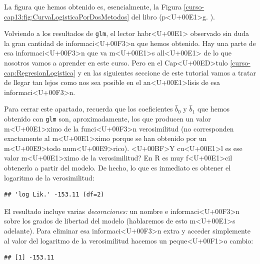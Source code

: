\documentclass[10pt,a4paper]{article}
\begin{document}
La figura que hemos obtenido es, esencialmente, la Figura \ref{curso-cap13:fig:CurvaLogisticaPorDosMetodos} del libro (p<U+00E1>g. \pageref{curso-cap13:fig:CurvaLogisticaPorDosMetodos}).

Volviendo a los resultados de {\tt glm}, el lector habr<U+00E1> observado sin duda la gran cantidad de informaci<U+00F3>n que hemos obtenido. Hay una parte de esa informaci<U+00F3>n que va m<U+00E1>s all<U+00E1> de lo que nosotros vamos a aprender en este curso. Pero en el Cap<U+00ED>tulo \ref{curso-cap:RegresionLogistica} y en las siguientes seccione de este tutorial vamos a tratar de llegar tan lejos como nos sea posible en el an<U+00E1>lisis de esa informaci<U+00F3>n.

Para cerrar este apartado, recuerda que los coeficientes $\hat b_0$ y $\hat b_1$ que hemos obtenido con {\tt glm} son, aproximadamente, los que producen un valor m<U+00E1>ximo de la funci<U+00F3>n verosimilitud (no corresponden exactamente al m<U+00E1>ximo porque se han obtenido por un m<U+00E9>todo num<U+00E9>rico). <U+00BF>Y cu<U+00E1>l es ese valor m<U+00E1>ximo de la verosimilitud? En R es muy f<U+00E1>cil obtenerlo a partir del modelo. De hecho, lo que es inmediato es obtener el logaritmo de la verosimilitud:
\begin{knitrout}
\color{fgcolor}\begin{kframe}
\begin{alltt}
 \hlkwb{=} 
\end{alltt}
\begin{verbatim}
## 'log Lik.' -153.11 (df=2)
\end{verbatim}
\end{kframe}
\end{knitrout}
El resultado incluye varias {\em decoraciones:} un nombre e informaci<U+00F3>n sobre los grados de libertad del modelo (hablaremos de esto m<U+00E1>s adelante). Para eliminar esa informaci<U+00F3>n extra y acceder simplemente al valor del logaritmo de la verosimilitud hacemos un peque<U+00F1>o cambio:
\begin{knitrout}
\color{fgcolor}\begin{kframe}
\begin{alltt}
 \hlkwb{=} \hlstd{(glmXY)[}\hlstd{])}
\end{alltt}
\begin{verbatim}
## [1] -153.11
\end{verbatim}
\end{kframe}
\end{knitrout}
\end{document}
